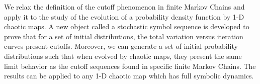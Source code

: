 %
%


We relax the definition of the cutoff phenomenon in finite Markov Chains and apply it to the study of the evolution of a probability density function by 1-D chaotic maps. A new object called a stochastic symbol sequence is developed to prove that for a set of initial distributions, the total variation versus iteration curves present cutoffs. Moreover, we can generate a set of initial probability
distributions such that when evolved by chaotic maps, they present the same limit behavior as the cutoff sequences found in specific finite Markov Chains. The results can be applied to any 1-D chaotic map which has full symbolic dynamics.
